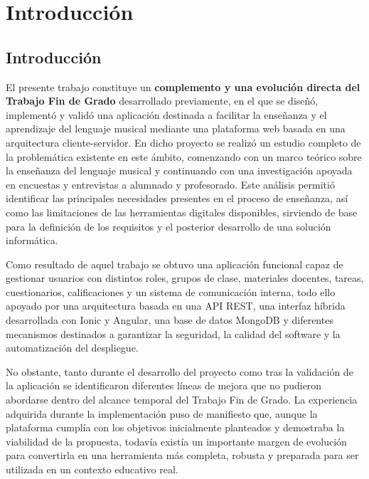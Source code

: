 \chapter{Introducción}
\label{chap:introduccion}

\section{Introducción}

El presente trabajo constituye un \textbf{complemento y una evolución directa del Trabajo Fin de Grado} desarrollado previamente, en el que se diseñó, implementó y validó una aplicación destinada a facilitar la enseñanza y el aprendizaje del lenguaje musical mediante una plataforma web basada en una arquitectura cliente-servidor. En dicho proyecto se realizó un estudio completo de la problemática existente en este ámbito, comenzando con un marco teórico sobre la enseñanza del lenguaje musical y continuando con una investigación apoyada en encuestas y entrevistas a alumnado y profesorado. Este análisis permitió identificar las principales necesidades presentes en el proceso de enseñanza, así como las limitaciones de las herramientas digitales disponibles, sirviendo de base para la definición de los requisitos y el posterior desarrollo de una solución informática.

Como resultado de aquel trabajo se obtuvo una aplicación funcional capaz de gestionar usuarios con distintos roles, grupos de clase, materiales docentes, tareas, cuestionarios, calificaciones y un sistema de comunicación interna, todo ello apoyado por una arquitectura basada en una API REST, una interfaz híbrida desarrollada con Ionic y Angular, una base de datos MongoDB y diferentes mecanismos destinados a garantizar la seguridad, la calidad del software y la automatización del despliegue.

No obstante, tanto durante el desarrollo del proyecto como tras la validación de la aplicación se identificaron diferentes líneas de mejora que no pudieron abordarse dentro del alcance temporal del Trabajo Fin de Grado. La experiencia adquirida durante la implementación puso de manifiesto que, aunque la plataforma cumplía con los objetivos inicialmente planteados y demostraba la viabilidad de la propuesta, todavía existía un importante margen de evolución para convertirla en una herramienta más completa, robusta y preparada para ser utilizada en un contexto educativo real.

